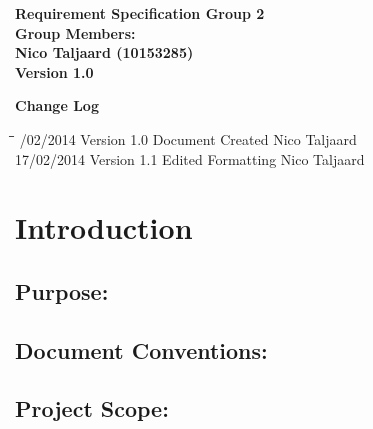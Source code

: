 \documentclass[12pt]{article}
\newcommand{\Title}{Requirement Specification} %
\begin{document}
\vspace{4em}

\begin{center}%

  \LARGE \bf \Title
  \LARGE {\bf Group 2}\\[2em]
  \LARGE {\bf Group Members:}\\[1em]
  \large
      Nico Taljaard			(10153285)\\[6em]
      
      {\bf Version 1.0}
    
\end{center}%

\newpage
	{\LARGE \bf Change Log}\\[2em]
	
	\begin{tabbing}
		\hspace*{3cm}\=\hspace*{3cm}\=\hspace*{8cm}\=\hspace*{3cm} /02/2014 \> Version 1.0 \> Document Created \> Nico Taljaard\\
		17/02/2014 \> Version 1.1 \> Edited Formatting \> Nico Taljaard\\
	\end{tabbing}

\newpage
	\tableofcontents	
	
\newpage
	\section{Introduction}
	
	\vspace{0.2in}

		\subsection{Purpose:}
		\vspace{0.1in}
		
	
	\vspace{0.2in}
	
		\subsection{Document Conventions:} %
		\vspace{0.1in}
		
	
	\vspace{0.2in}
	
		\subsection{Project Scope:}
		\vspace{0.1in}
		
\end{document}

